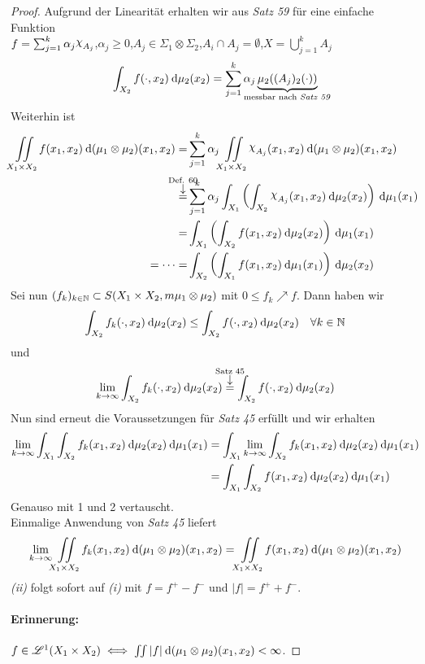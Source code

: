\documentclass[skript.tex]{subfiles}
\begin{document}
	\begin{proof}
		Aufgrund der Linearität erhalten wir aus \emph{Satz 59} für  eine einfache Funktion \\
		$f = \sum_{j=1}^k \alpha_j\rchi_{A_j}$,\quad $\alpha_j \geq 0$,\quad $A_j \in \Sigma_1 \otimes \Sigma_2$,\quad $A_i \cap A_j = \emptyset$,\quad $X = \bigcup_{j=1}^k A_j$
		\[
			\int_{X_2} f(\cdot,x_2) \md \mu_2(x_2) 
			= \sum_{j=1}^k \alpha_j \underbrace{\mu_2((A_j)_2(\cdot))}_{
				\mathclap{\text{messbar nach \emph{Satz 59}}}
			}
		\]
		Weiterhin ist
		\begin{align*}
			\iint\limits_{X_1 \times X_2} f(x_1,x_2) \md(\mu_1\otimes\mu_2)(x_1,x_2)
			=& \sum_{j=1}^k \alpha_j \iint\limits_{X_1 \times X_2} \rchi_{A_j}(x_1,x_2) \md(\mu_1\otimes\mu_2)(x_1,x_2) \\
			\darrow{\text{Def. 60}}{=}& \sum_{j=1}^k 
			\alpha_j \int_{X_1} \left(\int_{X_2} \rchi_{A_j}(x_1,x_2) \md\mu_2(x_2) \right)\md\mu_1(x_1) \\
			=& \int_{X_1} \left(\int_{X_2} f(x_1,x_2) \md\mu_2(x_2) \right)\md\mu_1(x_1) \\
			= \dotsb =&  \int_{X_2} \left(\int_{X_1} f(x_1,x_2) \md\mu_1(x_1) \right)\md\mu_2(x_2)
		\end{align*}
		Sei nun $(f_k)_{k\in\mathbb{N}} \subset S(X_1 \times X_2,m \mu_1 \otimes \mu_2)$ mit $0 \leq f_k \nearrow f$. Dann haben wir
		\[
			\int_{X_2} f_k(\cdot,x_2) \: \mathrm{d}\mu_2(x_2) \leq \int_{X_2} f(\cdot,x_2) \: \mathrm{d}\mu_2(x_2) \quad \forall k \in \mathbb{N}
		\]
		und
		\[
			\lim_{k\to\infty} \int_{X_2} f_k(\cdot,x_2) \md\mu_2(x_2) \darrow{\text{Satz 45}}{=} \int_{X_2} f(\cdot,x_2) \md\mu_2(x_2)
		\]
		Nun sind erneut die Voraussetzungen für \emph{Satz 45} erfüllt und wir erhalten
		\begin{align*}
			\lim_{k \to \infty} \int_{X_1} \int_{X_2} f_k(x_1,x_2) \: \mathrm{d}\mu_2(x_2) \: \mathrm{d}\mu_1(x_1)
			&= \int_{X_1} \lim_{k \to \infty} \int_{X_2} f_k(x_1,x_2) \: \mathrm{d}\mu_2(x_2) \: \mathrm{d}\mu_1(x_1) \\
			&= \int_{X_1} \int_{X_2} f(x_1,x_2) \: \mathrm{d}\mu_2(x_2) \: \mathrm{d}\mu_1(x_1)
		\end{align*}
		Genauso mit 1 und 2 vertauscht.\\
		Einmalige Anwendung von \emph{Satz 45} liefert
		\[
			\lim_{k\to\infty} \iint\limits_{X_1 \times X_2} f_k(x_1,x_2) \: \mathrm{d}(\mu_1\otimes\mu_2)(x_1,x_2)
			= \iint\limits_{X_1 \times X_2} f(x_1,x_2) \: \mathrm{d}(\mu_1\otimes\mu_2)(x_1,x_2)
		\]
		\emph{(ii)} folgt sofort auf \emph{(i)} mit $f=f^+ - f^-$ und $|f| = f^+ + f^-$.
		\paragraph{Erinnerung: } $f\in\mathscr{L}^1(X_1 \times X_2) \iff \iint |f| \: \mathrm{d}(\mu_1\otimes\mu_2)(x_1,x_2) < \infty$.
	\end{proof}
	
\end{document}
